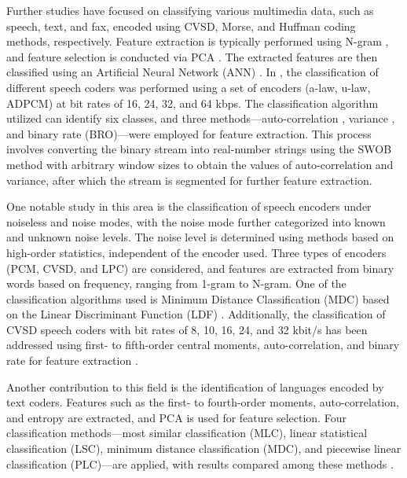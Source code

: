 Further studies have focused on classifying various multimedia data, such as speech, text, and fax, encoded using CVSD, Morse, and Huffman coding methods, respectively. Feature extraction is typically performed using N-gram \cite{Fink2014n-Gram}, and feature selection is conducted via PCA \cite{Gewers2021Principal}. The extracted features are then classified using an Artificial Neural Network (ANN) \cite{Tripathi2013A}. In \cite{Din2012Multimedia}, the classification of different speech coders was performed using a set of encoders (a-law, u-law, ADPCM) at bit rates of 16, 24, 32, and 64 kbps. The classification algorithm utilized can identify six classes, and three methods—auto-correlation \cite{Kant2010Identification}, variance \cite{Benetazzo2000Speech}, and binary rate (BRO)—were employed for feature extraction. This process involves converting the binary stream into real-number strings using the SWOB \cite{Ghataoura2009SWOB} method with arbitrary window sizes to obtain the values of auto-correlation and variance, after which the stream is segmented for further feature extraction.

One notable study in this area is the classification of speech encoders under noiseless and noise modes, with the noise mode further categorized into known and unknown noise levels. The noise level is determined using methods based on high-order statistics, independent of the encoder used. Three types of encoders (PCM, CVSD, and LPC) are considered, and features are extracted from binary words based on frequency, ranging from 1-gram to N-gram. One of the classification algorithms used is Minimum Distance Classification (MDC) based on the Linear Discriminant Function (LDF) \cite{Maithani2004Speech}. Additionally, the classification of CVSD speech coders with bit rates of 8, 10, 16, 24, and 32 kbit/s has been addressed using first- to fifth-order central moments, auto-correlation, and binary rate for feature extraction \cite{Tripathi2014A}.

Another contribution to this field is the identification of languages encoded by text coders. Features such as the first- to fourth-order moments, auto-correlation, and entropy are extracted, and PCA is used for feature selection. Four classification methods—most similar classification (MLC), linear statistical classification (LSC), minimum distance classification (MDC), and piecewise linear classification (PLC)—are applied, with results compared among these methods \cite{Kant2010Identification}.